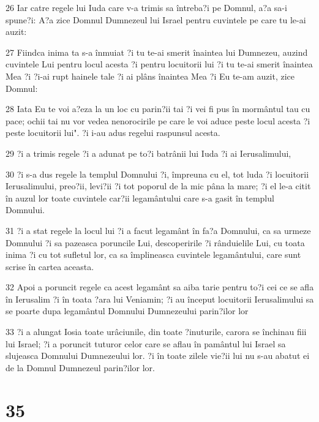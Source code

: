\par 26 Iar catre regele lui Iuda care v-a trimis sa întreba?i pe Domnul, a?a sa-i spune?i: A?a zice Domnul Dumnezeul lui Israel pentru cuvintele pe care tu le-ai auzit:
\par 27 Fiindca inima ta s-a înmuiat ?i tu te-ai smerit înaintea lui Dumnezeu, auzind cuvintele Lui pentru locul acesta ?i pentru locuitorii lui ?i tu te-ai smerit înaintea Mea ?i ?i-ai rupt hainele tale ?i ai plâns înaintea Mea ?i Eu te-am auzit, zice Domnul:
\par 28 Iata Eu te voi a?eza la un loc cu parin?ii tai ?i vei fi pus în mormântul tau cu pace; ochii tai nu vor vedea nenorocirile pe care le voi aduce peste locul acesta ?i peste locuitorii lui". ?i i-au adus regelui raspunsul acesta.
\par 29 ?i a trimis regele ?i a adunat pe to?i batrânii lui Iuda ?i ai Ierusalimului,
\par 30 ?i s-a dus regele la templul Domnului ?i, împreuna cu el, tot luda ?i locuitorii Ierusalimului, preo?ii, levi?ii ?i tot poporul de la mic pâna la mare; ?i el le-a citit în auzul lor toate cuvintele car?ii legamântului care s-a gasit în templul Domnului.
\par 31 ?i a stat regele la locul lui ?i a facut legamânt în fa?a Domnului, ca sa urmeze Domnului ?i sa pazeasca poruncile Lui, descoperirile ?i rânduielile Lui, cu toata inima ?i cu tot sufletul lor, ca sa împlineasca cuvintele legamântului, care sunt scrise în cartea aceasta.
\par 32 Apoi a poruncit regele ca acest legamânt sa aiba tarie pentru to?i cei ce se afla în Ierusalim ?i în toata ?ara lui Veniamin; ?i au început locuitorii Ierusalimului sa se poarte dupa legamântul Domnului Dumnezeului parin?ilor lor
\par 33 ?i a alungat Iosia toate urâciunile, din toate ?inuturile, carora se închinau fiii lui Israel; ?i a poruncit tuturor celor care se aflau în pamântul lui Israel sa slujeasca Domnului Dumnezeului lor. ?i în toate zilele vie?ii lui nu s-au abatut ei de la Domnul Dumnezeul parin?ilor lor.

\chapter{35}

